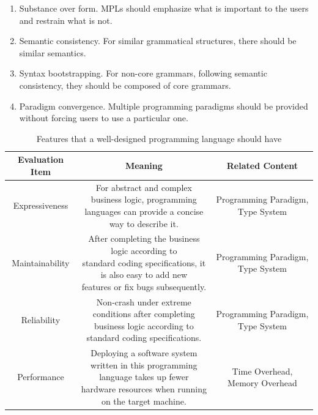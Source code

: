 \begin{enumerate}
    \item Substance over form. MPLs should emphasize what is important to the users and restrain what is not.
    \item Semantic consistency. For similar grammatical structures, there should be similar semantics.
    \item Syntax bootstrapping. For non-core grammars, following semantic consistency, they should be composed of core grammars.
    \item Paradigm convergence. Multiple programming paradigms should be provided without forcing users to use a particular one.
\end{enumerate}

\begin{table}[hb]
    \caption{Features that a well-designed programming language should have}
    \label{tab:evaluate}
    \begin{center}
        \begin{tabular}{ccc}
            \toprule
            Evaluation Item & Meaning & Related Content \\
            \midrule
            Expressiveness &
            \makecell[l]{
                For abstract and complex business logic, programming \\
                languages can provide a concise way to describe it.
            }
            & Programming Paradigm, Type System \\
            \midrule
            Maintainability &
            \makecell[l]{
                After completing the business logic according to \\
                standard coding specifications, it is also easy to add new \\ features or
                fix bugs subsequently.
            }
            & Programming Paradigm, Type System \\
            \midrule
            Reliability &
            \makecell[l]{
                Non-crash under extreme conditions after completing \\
                business logic according to standard coding specifications.
            }
            & Programming Paradigm, Type System \\
            \midrule
            Performance &
            \makecell[l]{
                Deploying a software system written in this programming \\
                language takes up fewer hardware resources when running \\ on the target
                machine.
            }
            & Time Overhead, Memory Overhead \\
            \bottomrule
        \end{tabular}
    \end{center}
\end{table}


